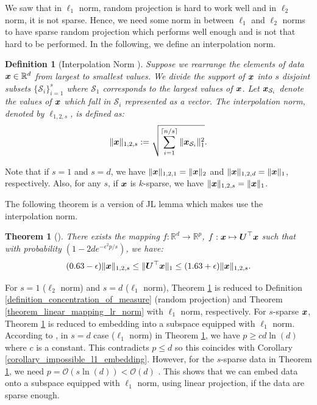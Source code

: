 \documentclass{article}
\newtheorem{theorem}{Theorem}
\newtheorem{definition}{Definition}
\def\b{\ensuremath\boldsymbol}
\begin{document}
We saw that in $\ell_1$ norm, random projection is hard to work well and in $\ell_2$ norm, it is not sparse. Hence, we need some norm in between $\ell_1$ and $\ell_2$ norms to have sparse random projection which performs well enough and is not that hard to be performed. 
In the following, we define an interpolation norm. 
\begin{definition}[Interpolation Norm {\citep[Appendix]{krahmer2016unified}}]
Suppose we rearrange the elements of data $\b{x} \in \mathbb{R}^d$ from largest to smallest values. 
We divide the support of $\b{x}$ into $s$ disjoint subsets $\{\mathcal{S}_i\}_{i=1}^s$ where $\mathcal{S}_1$ corresponds to the largest values of $\b{x}$. Let $\b{x}_{\mathcal{S}_i}$ denote the values of $\b{x}$ which fall in $\mathcal{S}_i$ represented as a vector. 
The interpolation norm, denoted by $\ell_{1,2,s}$, is defined as:
\begin{align}
\|\b{x}\|_{1,2,s} := \sqrt{\sum_{i=1}^{\lceil n/s \rceil} \|\b{x}_{\mathcal{S}_i}\|_1^2}.
\end{align}
\end{definition}
Note that if $s=1$ and $s=d$, we have $\|\b{x}\|_{1,2,1} = \|\b{x}\|_2$ and $\|\b{x}\|_{1,2,d} = \|\b{x}\|_1$, respectively. Also, for any $s$, if $\b{x}$ is $k$-sparse, we have $\|\b{x}\|_{1,2,s} = \|\b{x}\|_1$. 

The following theorem is a version of JL lemma which makes use the interpolation norm. 
\begin{theorem}[{\citep[Theorem 2]{krahmer2016unified}}]\label{theorem_linear_mapping_interpolation_norm}
There exists the mapping $f: \mathbb{R}^d \rightarrow \mathbb{R}^p$, $f: \b{x} \mapsto \b{U}^\top \b{x}$ such that with probability $(1 - 2d e^{-\epsilon^2 p / s})$, we have:
\begin{align}
(0.63 - \epsilon) \|\b{x}\|_{1,2,s} \leq \|\b{U}^\top \b{x}\|_1 \leq (1.63 + \epsilon) \|\b{x}\|_{1,2,s}.
\end{align}
\end{theorem}
For $s=1$ ($\ell_2$ norm) and $s=d$ ($\ell_1$ norm), Theorem \ref{theorem_linear_mapping_interpolation_norm} is reduced to Definition \ref{definition_concentration_of_measure} (random projection) and Theorem \ref{theorem_linear_mapping_lr_norm} with $\ell_1$ norm, respectively. 
For $s$-sparse $\b{x}$, Theorem \ref{theorem_linear_mapping_interpolation_norm} is reduced to embedding into a subspace equipped with $\ell_1$ norm. 
According to \cite{krahmer2016unified}, in $s=d$ case ($\ell_1$ norm) in Theorem \ref{theorem_linear_mapping_interpolation_norm}, we have $p \geq c d \ln(d)$ where $c$ is a constant. This contradicts $p \leq d$ so this coincides with Corollary \ref{corollary_impossible_l1_embedding}. 
However, for the $s$-sparse data in Theorem \ref{theorem_linear_mapping_interpolation_norm}, we need $p = \mathcal{O}(s \ln(d)) < \mathcal{O}(d)$ \cite{krahmer2016unified}. This shows that we can embed data onto a subspace equipped with $\ell_1$ norm, using linear projection, if the data are sparse enough. 
\end{document}
